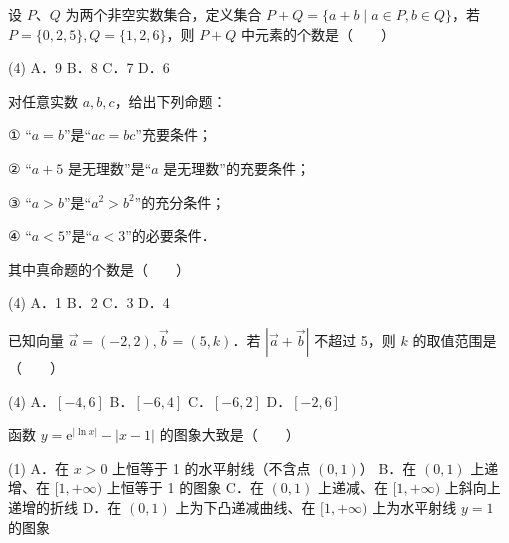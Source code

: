 

\begin{question}
设 $P$、$Q$ 为两个非空实数集合，定义集合 $P + Q = \{a + b \mid a \in P, b \in Q\}$，若 $P = \{0, 2, 5\}, Q = \{1, 2, 6\}$，则 $P + Q$ 中元素的个数是\mbox{（　　）}

\begin{gkopts}(4)
\task A．9
\task B．8
\task C．7
\task D．6
\end{gkopts}

\end{question}
\begin{question}
对任意实数 $a, b, c$，给出下列命题：

① “$a = b$”是“$ac = bc$”充要条件；

② “$a + 5$ 是无理数”是“$a$ 是无理数”的充要条件；

③ “$a > b$”是“$a^2 > b^2$”的充分条件；

④ “$a < 5$”是“$a < 3$”的必要条件．

其中真命题的个数是\mbox{（　　）}

\begin{gkopts}(4)
\task A．1
\task B．2
\task C．3
\task D．4
\end{gkopts}

\end{question}
\begin{question}
已知向量 $\vec{a} = (-2, 2), \vec{b} = (5, k)$．若 $|\vec{a} + \vec{b}|$ 不超过 5，则 $k$ 的取值范围是\mbox{（　　）}

\begin{gkopts}(4)
\task A．$[-4, 6]$
\task B．$[-6, 4]$
\task C．$[-6, 2]$
\task D．$[-2, 6]$
\end{gkopts}

\Needspace{0.4\textheight}
\end{question}
\begin{question}
函数 $y = \mathrm{e}^{|\ln x|} - |x - 1|$ 的图象大致是\mbox{（　　）}
\nopagebreak[4]
\begin{center}\end{center}
\nopagebreak[4]
\begin{gkopts}(1)
\task A．在 $x > 0$ 上恒等于 1 的水平射线（不含点 $(0, 1)$）
\task B．在 $(0, 1)$ 上递增、在 $[1, +\infty)$ 上恒等于 1 的图象
\task C．在 $(0, 1)$ 上递减、在 $[1, +\infty)$ 上斜向上递增的折线
\task D．在 $(0, 1)$ 上为下凸递减曲线、在 $[1, +\infty)$ 上为水平射线 $y = 1$ 的图象
\end{gkopts}

\end{question}

